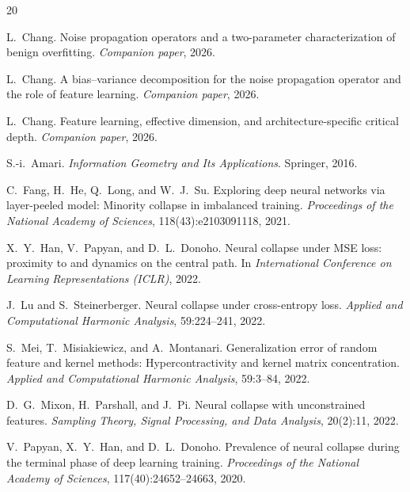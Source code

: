 \documentclass[12pt]{amsart}
\theoremstyle{definition}
\theoremstyle{remark}
\begin{document}
\begin{thebibliography}{20}

L.~Chang.
\newblock Noise propagation operators and a two-parameter characterization
  of benign overfitting.
\newblock \emph{Companion paper}, 2026.

L.~Chang.
\newblock A bias--variance decomposition for the noise propagation operator
  and the role of feature learning.
\newblock \emph{Companion paper}, 2026.

L.~Chang.
\newblock Feature learning, effective dimension, and architecture-specific
  critical depth.
\newblock \emph{Companion paper}, 2026.

S.-i.~Amari.
\newblock \emph{Information Geometry and Its Applications}.
\newblock Springer, 2016.

C.~Fang, H.~He, Q.~Long, and W.~J.~Su.
\newblock Exploring deep neural networks via layer-peeled model:
  Minority collapse in imbalanced training.
\newblock \emph{Proceedings of the National Academy of Sciences},
  118(43):e2103091118, 2021.

X.~Y.~Han, V.~Papyan, and D.~L.~Donoho.
\newblock Neural collapse under MSE loss: proximity to and dynamics on
  the central path.
\newblock In \emph{International Conference on Learning Representations
  (ICLR)}, 2022.

J.~Lu and S.~Steinerberger.
\newblock Neural collapse under cross-entropy loss.
\newblock \emph{Applied and Computational Harmonic Analysis},
  59:224--241, 2022.

S.~Mei, T.~Misiakiewicz, and A.~Montanari.
\newblock Generalization error of random feature and kernel methods:
  Hypercontractivity and kernel matrix concentration.
\newblock \emph{Applied and Computational Harmonic Analysis},
  59:3--84, 2022.

D.~G.~Mixon, H.~Parshall, and J.~Pi.
\newblock Neural collapse with unconstrained features.
\newblock \emph{Sampling Theory, Signal Processing, and Data Analysis},
  20(2):11, 2022.

V.~Papyan, X.~Y.~Han, and D.~L.~Donoho.
\newblock Prevalence of neural collapse during the terminal phase of deep
  learning training.
\newblock \emph{Proceedings of the National Academy of Sciences},
  117(40):24652--24663, 2020.

\end{thebibliography}
\end{document}
